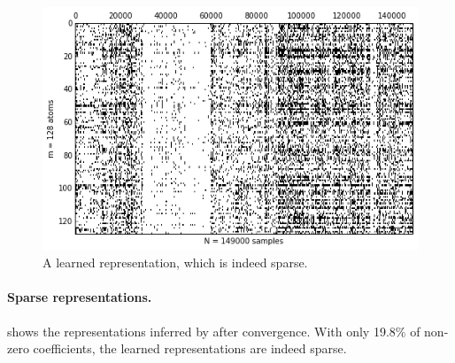 \begin{figure}[ht]
	\centering
	\includegraphics[width=\textwidth]{img/sparse_representations}
	\caption[]{A learned representation, which is indeed sparse.}
	\label{fig:sparse_representations}
\end{figure}

\paragraph{Sparse representations.}
 shows the representations inferred by  after convergence. With only 19.8\% of non-zero coefficients, the learned representations are indeed sparse.

